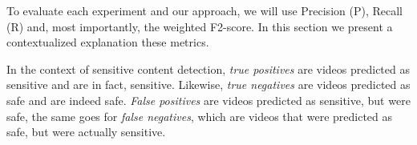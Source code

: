 To evaluate each experiment and our approach, we will use Precision (P), Recall (R) and, most importantly, the weighted F2-score. In this section we present a contextualized explanation these metrics.




In the context of sensitive content detection, \textit{true positives} are videos predicted as sensitive and are in fact, sensitive. Likewise, \textit{true negatives} are videos predicted as safe and are indeed safe. \textit{False positives} are videos predicted as sensitive, but were safe, the same goes for \textit{false negatives}, which are videos that were predicted as safe, but were actually sensitive.

